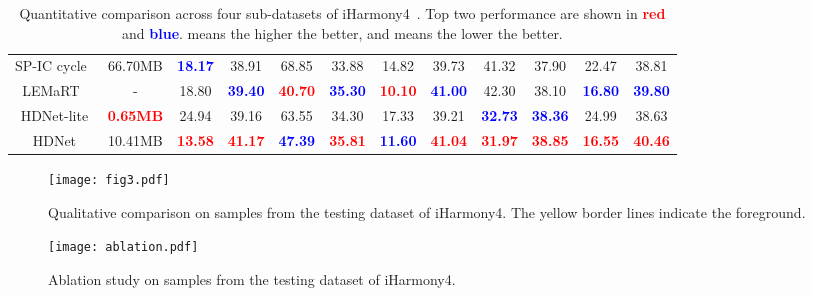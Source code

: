 \documentclass[sigconf]{acmart}
\begin{document}
\begin{table*}[t]
{\begin{tabular}{cccccccccccc}
			SP-IC cycle~\cite{cai2023structure}& 66.70MB & \textbf{\textcolor{blue}{18.17}} & 38.91 & 68.85 &33.88&14.82& 39.73&41.32& 37.90&22.47&38.81  \\
			LEMaRT~\cite{liu2023lemart}& - & 18.80 &\textbf{\textcolor{blue}{39.40}} & \textbf{\textcolor{red}{40.70}} &\textbf{\textcolor{blue}{35.30}} &\textbf{\textcolor{red}{10.10}}& \textbf{\textcolor{blue}{41.00}} & 42.30& 38.10& \textbf{\textcolor{blue}{16.80}} &\textbf{\textcolor{blue}{39.80}}  \\
			\midrule
			HDNet-lite &\textbf{\textcolor{red}{0.65MB}}&24.94 & 39.16 & 63.55& 34.30 & 17.33 &39.21 & \textbf{\textcolor{blue}{32.73}} & \textbf{\textcolor{blue}{38.36}} &24.99& 38.63\\
			HDNet&10.41MB&\textbf{\textcolor{red}{13.58}}&\textbf{\textcolor{red}{41.17}} & \textbf{\textcolor{blue}{47.39}} & \textbf{\textcolor{red}{35.81}} & 
			\textbf{\textcolor{blue}{11.60}} & \textbf{\textcolor{red}{41.04}} & \textbf{\textcolor{red}{31.97}} & \textbf{\textcolor{red}{38.85}} & \textbf{\textcolor{red}{16.55}} & \textbf{\textcolor{red}{40.46}} \\
			\bottomrule
	\end{tabular}}
	\caption{Quantitative comparison across four sub-datasets of iHarmony4~\cite{DoveNet}. Top two performance are shown in \textbf{\textcolor{red}{red}} and \textbf{\textcolor{blue}{blue}}.  means the higher the better, and  means the lower the better.}
	\label{tab:my_label}
\end{table*}


\begin{figure*}[t]
	\centering
	\texttt{[image: fig3.pdf]}
	\caption{Qualitative comparison on samples from the testing dataset of iHarmony4. The yellow border lines indicate the foreground.}
	\label{fig3}
\end{figure*}


\begin{figure*}[t]
	\centering
	\texttt{[image: ablation.pdf]}
	\caption{Ablation study on samples from the testing dataset of iHarmony4.}
	\label{fig3}
\end{figure*}
\end{document}

